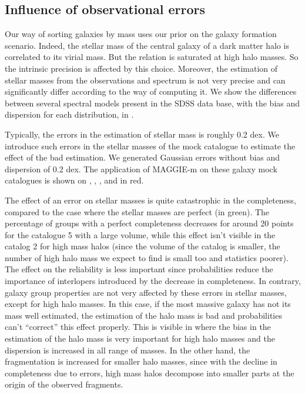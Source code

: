 \subsection{Influence of observational errors}
\label{sub:observational_errors}

Our way of sorting galaxies by mass uses our prior on the galaxy formation
scenario. Indeed, the stellar mass of the central galaxy of a dark matter halo
is correlated to its virial mass. But the relation is saturated at high halo
masses. So the intrinsic precision is affected by this choice. Moreover, the
estimation of stellar masses from the observations and spectrum is not very
precise and can significantly differ according to the way of computing it. We
show the differences between several spectral models present in the SDSS data
base, with the bias and dispersion for each distribution, in
.

Typically, the errors in the estimation of stellar mass is roughly 0.2 dex. We
introduce such errors in the stellar masses of the mock catalogue to estimate
the effect of the bad estimation. We generated Gaussian errors without bias and
dispersion of 0.2 dex. The application of MAGGIE-m on these galaxy mock
catalogues is shown on , ,
,  and
 in red.

The effect of an error on stellar masses is quite catastrophic in the
completeness, compared to the case where the stellar masses are perfect (in
green). The percentage of groups with a perfect completeness decreases for
around 20 points for the catalogue 5 with a large volume, while this effect
isn't visible in the catalog 2 for high mass halos (since the volume of the
catalog is smaller, the number of high halo mass we expect to find is small too
and statistics poorer). The effect on the reliability is less important since
probabilities reduce the importance of interlopers introduced by the decrease
in completeness. In contrary, galaxy group properties are not very affected by
these errors in stellar masses, except for high halo masses. In this case, if
the most massive galaxy has not its mass well estimated, the estimation of the
halo mass is bad and probabilities can't ``correct'' this effect properly. This
is visible in  where the bias in the
estimation of the halo mass is very important for high halo masses and the
dispersion is increased in all range of masses. In the other hand, the
fragmentation is increased for smaller halo masses, since with the decline in
completeness due to errors, high mass halos decompose into smaller parts at the
origin of the observed fragments.

